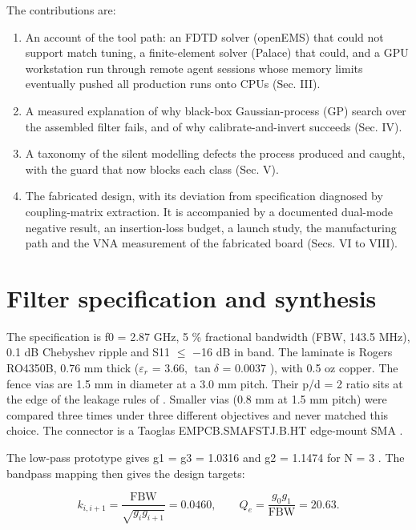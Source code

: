 \documentclass{ieeeaccess}
\begin{document}
The contributions are:

\begin{enumerate}
\def\labelenumi{\arabic{enumi}.}
\item
  An account of the tool path: an FDTD solver (openEMS) that could not
  support match tuning, a finite-element solver (Palace) that could, and a
  GPU workstation run through remote agent sessions whose memory limits
  eventually pushed all production runs onto CPUs (Sec. III).
\item
  A measured explanation of why black-box Gaussian-process (GP) search over
  the assembled filter fails, and of why calibrate-and-invert succeeds
  (Sec. IV).
\item
  A taxonomy of the silent modelling defects the process produced and
  caught, with the guard that now blocks each class (Sec. V).
\item
  The fabricated design, with its deviation from specification diagnosed by
  coupling-matrix extraction. It is accompanied by a documented dual-mode
  negative result, an insertion-loss budget, a launch study, the
  manufacturing path and the VNA measurement of the fabricated board
  (Secs. VI to VIII).
\end{enumerate}

\hypertarget{filter-specification-and-synthesis}{%
\section{Filter specification and synthesis}\label{filter-specification-and-synthesis}}

The specification is f0 = 2.87 GHz, 5 \% fractional bandwidth (FBW, 143.5 MHz),
0.1 dB Chebyshev ripple and \textbar S11\textbar{} \(\le\) \ensuremath{-}16 dB in band. The laminate is Rogers
RO4350B, 0.76 mm thick (\(\varepsilon_r\) = 3.66, \(\tan\delta\) = 0.0037 \cite{rogers4350b}), with
0.5 oz copper. The fence vias are 1.5 mm in diameter at a 3.0 mm pitch. Their
p/d = 2 ratio sits at the edge of the leakage rules of
\cite{xu2005guided, deslandes2006accurate}. Smaller vias (0.8 mm at 1.5 mm pitch)
were compared three times under three different objectives and never matched
this choice. The connector is a Taoglas EMPCB.SMAFSTJ.B.HT edge-mount SMA
\cite{taoglas_sma}.

The low-pass prototype gives g1 = g3 = 1.0316 and g2 = 1.1474 for N = 3
\cite{hong2001microstrip}. The bandpass mapping then gives the design targets:

\[ k_{i,i+1} = \frac{\text{FBW}}{\sqrt{g_i g_{i+1}}} = 0.0460,
\qquad Q_e = \frac{g_0 g_1}{\text{FBW}} = 20.63 . \]
\end{document}
